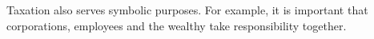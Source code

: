 Taxation also serves symbolic purposes.
For example, it is important that corporations, employees and the wealthy take responsibility together.